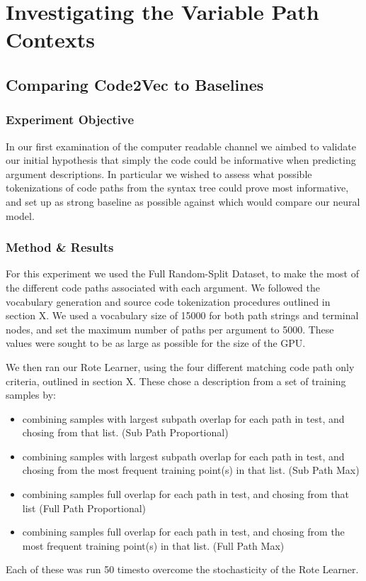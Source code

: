 \section{Investigating the Variable Path Contexts} %
\label{sec:investigating_the_computer_channel}

\subsection{Comparing Code2Vec to Baselines} %
\label{sub:comparing_code2vec_to_baselines}


\subsubsection{Experiment Objective} %

In our first examination of the computer readable channel we aimbed to validate our initial hypothesis that simply the code could be informative when predicting argument descriptions.
In particular we wished to assess what possible tokenizations of code paths from the syntax tree could prove most informative, and set up as strong baseline as possible against which would compare our neural model.



\subsubsection{Method \& Results} %

For this experiment we used the Full Random-Split Dataset, to make the most of the different code paths associated with each argument.
We followed the vocabulary generation and source code tokenization procedures outlined in section X. 
We used a vocabulary size of 15000 for both path strings and terminal nodes, and set the maximum number of paths per argument to  5000.
These values were sought to be as large as possible for the size of the GPU. 

We then ran our Rote Learner, using the four different matching code path only criteria, outlined in section X. 
These chose a description from a set of training samples by:
    \begin{itemize}
        \item combining samples with largest subpath overlap for each path in test, and chosing from that list. (Sub Path Proportional)
        \item combining samples with largest subpath overlap for each path in test, and chosing from the most frequent training point(s) in that list. (Sub Path Max)
        \item combining samples full overlap for each path in test, and chosing from that list (Full Path Proportional)
        \item combining samples full overlap for each path in test, and chosing from the most frequent training point(s) in that list. (Full Path Max)
    \end{itemize}
Each of these was run 50 timesto overcome the stochasticity of the Rote Learner.

